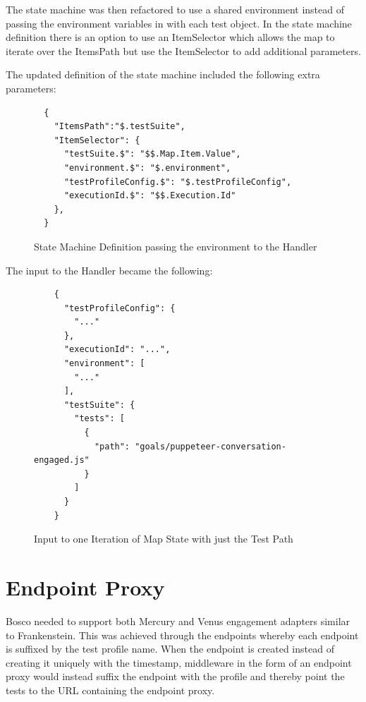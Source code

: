 \documentclass[12pt,a4paper,titlepage]{report}
\begin{document}
The state machine was then refactored to use a shared environment instead of
passing the environment variables in with each test object. In the state machine definition there is an option to
use an ItemSelector which allows the map to iterate over the ItemsPath but use the ItemSelector to add additional
parameters.

The updated definition of the state machine included the following extra parameters:

\begin{figure}[H]
 \begin{tcolorbox}
  \begin{verbatim}
  {
    "ItemsPath":"$.testSuite",
    "ItemSelector": {
      "testSuite.$": "$$.Map.Item.Value",
      "environment.$": "$.environment",
      "testProfileConfig.$": "$.testProfileConfig",
      "executionId.$": "$$.Execution.Id"
    },
  }
\end{verbatim}
 \end{tcolorbox}
 \caption{State Machine Definition passing the environment to the Handler}
\end{figure}

The input to the Handler became the following:

\begin{figure}[ht]
 \begin{tcolorbox}
  \begin{verbatim}
    {
      "testProfileConfig": {
        "..."
      },
      "executionId": "...",
      "environment": [
        "..."
      ],
      "testSuite": {
        "tests": [
          {
            "path": "goals/puppeteer-conversation-engaged.js"
          }
        ]
      }
    }
\end{verbatim}
 \end{tcolorbox}
 \caption{Input to one Iteration of Map State with just the Test Path}
\end{figure}

\section{Endpoint Proxy}

Bosco needed to support both Mercury and Venus engagement adapters similar to Frankenstein. This was achieved through the endpoints whereby 
each endpoint is suffixed by the test profile name. When the endpoint is created instead of creating it uniquely with the timestamp, middleware 
in the form of an endpoint proxy would instead suffix the endpoint with the profile and thereby point the tests to the URL 
containing the endpoint proxy. 
\end{document}

